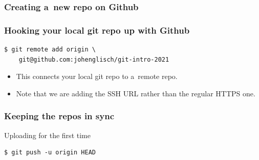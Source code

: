 \documentclass[12pt]{beamer}
\begin{document}
\begin{frame}
  \frametitle{Creating a~new repo on Github}

\end{frame}

\begin{frame}[fragile]
  \frametitle{Hooking your local git repo up with Github}

  {\footnotesize{}%
    \begin{verbatim}
$ git remote add origin \
    git@github.com:johenglisch/git-intro-2021
    \end{verbatim}%
  }
  \begin{itemize}
    \item This connects your \alert{local} git repo to a~\alert{remote} repo.
    \item Note that we are adding the SSH URL rather than the regular HTTPS one.
  \end{itemize}
\end{frame}

\begin{frame}[fragile]
  \frametitle{Keeping the repos in sync}

  \begin{block}{Uploading for the first time}
    {\footnotesize{}%
      \begin{verbatim}
$ git push -u origin HEAD
      \end{verbatim}%
    }
  \end{block}
\end{frame}

\end{document}
